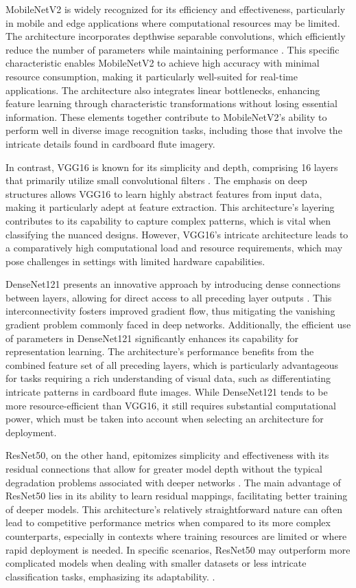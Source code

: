 MobileNetV2 is widely recognized for its efficiency and effectiveness, particularly in mobile and edge applications where computational resources may be limited. The architecture incorporates depthwise separable convolutions, which efficiently reduce the number of parameters while maintaining performance \cite{Howard2021}. This specific characteristic enables MobileNetV2 to achieve high accuracy with minimal resource consumption, making it particularly well-suited for real-time applications. The architecture also integrates linear bottlenecks, enhancing feature learning through characteristic transformations without losing essential information. These elements together contribute to MobileNetV2's ability to perform well in diverse image recognition tasks, including those that involve the intricate details found in cardboard flute imagery.


In contrast, VGG16 is known for its simplicity and depth, comprising 16 layers that primarily utilize small convolutional filters \cite{Simonyan2015}. The emphasis on deep structures allows VGG16 to learn highly abstract features from input data, making it particularly adept at feature extraction. This architecture's layering contributes to its capability to capture complex patterns, which is vital when classifying the nuanced designs. However, VGG16's intricate architecture leads to a comparatively high computational load and resource requirements, which may pose challenges in settings with limited hardware capabilities.


DenseNet121 presents an innovative approach by introducing dense connections between layers, allowing for direct access to all preceding layer outputs \cite{Huang2018}. This interconnectivity fosters improved gradient flow, thus mitigating the vanishing gradient problem commonly faced in deep networks. Additionally, the efficient use of parameters in DenseNet121 significantly enhances its capability for representation learning. The architecture's performance benefits from the combined feature set of all preceding layers, which is particularly advantageous for tasks requiring a rich understanding of visual data, such as differentiating intricate patterns in cardboard flute images. While DenseNet121 tends to be more resource-efficient than VGG16, it still requires substantial computational power, which must be taken into account when selecting an architecture for deployment.


ResNet50, on the other hand, epitomizes simplicity and effectiveness with its residual connections that allow for greater model depth without the typical degradation problems associated with deeper networks \cite{He2016}. The main advantage of ResNet50 lies in its ability to learn residual mappings, facilitating better training of deeper models. This architecture's relatively straightforward nature can often lead to competitive performance metrics when compared to its more complex counterparts, especially in contexts where training resources are limited or where rapid deployment is needed. In specific scenarios, ResNet50 may outperform more complicated models when dealing with smaller datasets or less intricate classification tasks, emphasizing its adaptability. \cite{Romero2019}.



